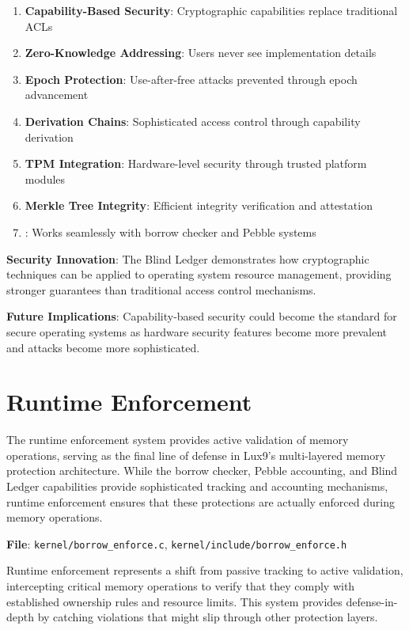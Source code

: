 \documentclass[11pt,letterpaper]{article}
\begin{document}
\begin{enumerate}
\item \textbf{Capability-Based Security}: Cryptographic capabilities replace traditional ACLs
\item \textbf{Zero-Knowledge Addressing}: Users never see implementation details
\item \textbf{Epoch Protection}: Use-after-free attacks prevented through epoch advancement
\item \textbf{Derivation Chains}: Sophisticated access control through capability derivation
\item \textbf{TPM Integration}: Hardware-level security through trusted platform modules
\item \textbf{Merkle Tree Integrity}: Efficient integrity verification and attestation
\item {}: Works seamlessly with borrow checker and Pebble systems
\end{enumerate}

\textbf{Security Innovation}: The Blind Ledger demonstrates how cryptographic techniques can be applied to operating system resource management, providing stronger guarantees than traditional access control mechanisms.

\textbf{Future Implications}: Capability-based security could become the standard for secure operating systems as hardware security features become more prevalent and attacks become more sophisticated.

\section{Runtime Enforcement}

The runtime enforcement system provides active validation of memory operations, serving as the final line of defense in Lux9's multi-layered memory protection architecture. While the borrow checker, Pebble accounting, and Blind Ledger capabilities provide sophisticated tracking and accounting mechanisms, runtime enforcement ensures that these protections are actually enforced during memory operations.

\textbf{File}: \texttt{kernel/borrow\_enforce.c}, \texttt{kernel/include/borrow\_enforce.h}

Runtime enforcement represents a shift from passive tracking to active validation, intercepting critical memory operations to verify that they comply with established ownership rules and resource limits. This system provides defense-in-depth by catching violations that might slip through other protection layers.
\end{document}
